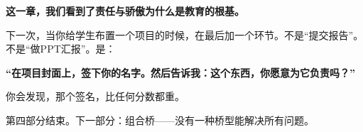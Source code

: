 \vspace{1cm}

\begin{decision-point}
\label{decision:chap12}

\noindent\textbf{这一章，我们看到了责任与骄傲为什么是教育的根基。}

\vspace{0.3cm}

\noindent 下一次，当你给学生布置一个项目的时候，在最后加一个环节。不是``提交报告''。不是``做PPT汇报''。是：

\noindent \textbf{``在项目封面上，签下你的名字。然后告诉我：这个东西，你愿意为它负责吗？''}

\noindent 你会发现，那个签名，比任何分数都重。
\end{decision-point}

\vspace{0.5cm}

\begin{flushright}
{\small\color{muted} 第四部分结束。下一部分：组合桥——没有一种桥型能解决所有问题。}
\end{flushright}
